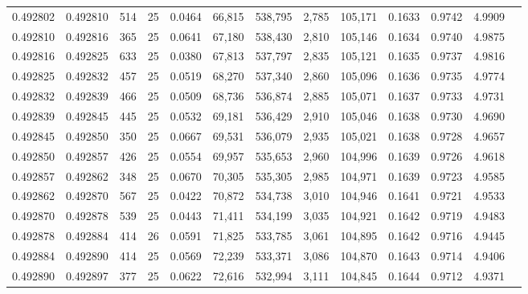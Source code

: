 \begin{tabular}{rrrrrrrrrrrrr}
0.492802 & 0.492810 &   514 &  25 &                                     0.0464 &  66,815 & 538,795 &   2,785 & 105,171 & 0.1633 & 0.9742 & 4.9909 \\
0.492810 & 0.492816 &   365 &  25 &                                     0.0641 &  67,180 & 538,430 &   2,810 & 105,146 & 0.1634 & 0.9740 & 4.9875 \\
0.492816 & 0.492825 &   633 &  25 &                                     0.0380 &  67,813 & 537,797 &   2,835 & 105,121 & 0.1635 & 0.9737 & 4.9816 \\
0.492825 & 0.492832 &   457 &  25 &                                     0.0519 &  68,270 & 537,340 &   2,860 & 105,096 & 0.1636 & 0.9735 & 4.9774 \\
0.492832 & 0.492839 &   466 &  25 &                                     0.0509 &  68,736 & 536,874 &   2,885 & 105,071 & 0.1637 & 0.9733 & 4.9731 \\
0.492839 & 0.492845 &   445 &  25 &                                     0.0532 &  69,181 & 536,429 &   2,910 & 105,046 & 0.1638 & 0.9730 & 4.9690 \\
0.492845 & 0.492850 &   350 &  25 &                                     0.0667 &  69,531 & 536,079 &   2,935 & 105,021 & 0.1638 & 0.9728 & 4.9657 \\
0.492850 & 0.492857 &   426 &  25 &                                     0.0554 &  69,957 & 535,653 &   2,960 & 104,996 & 0.1639 & 0.9726 & 4.9618 \\
0.492857 & 0.492862 &   348 &  25 &                                     0.0670 &  70,305 & 535,305 &   2,985 & 104,971 & 0.1639 & 0.9723 & 4.9585 \\
0.492862 & 0.492870 &   567 &  25 &                                     0.0422 &  70,872 & 534,738 &   3,010 & 104,946 & 0.1641 & 0.9721 & 4.9533 \\
0.492870 & 0.492878 &   539 &  25 &                                     0.0443 &  71,411 & 534,199 &   3,035 & 104,921 & 0.1642 & 0.9719 & 4.9483 \\
0.492878 & 0.492884 &   414 &  26 &                                     0.0591 &  71,825 & 533,785 &   3,061 & 104,895 & 0.1642 & 0.9716 & 4.9445 \\
0.492884 & 0.492890 &   414 &  25 &                                     0.0569 &  72,239 & 533,371 &   3,086 & 104,870 & 0.1643 & 0.9714 & 4.9406 \\
0.492890 & 0.492897 &   377 &  25 &                                     0.0622 &  72,616 & 532,994 &   3,111 & 104,845 & 0.1644 & 0.9712 & 4.9371 \\

\end{tabular}

